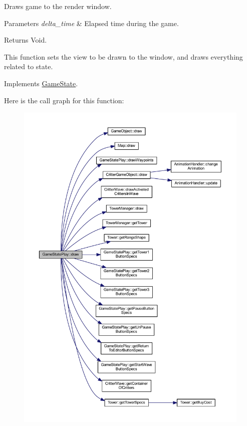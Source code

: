 Draws game to the render window. 


\begin{DoxyParams}{Parameters}
{\em delta\+\_\+time} & Elapsed time during the game. \\
\hline
\end{DoxyParams}
\begin{DoxyReturn}{Returns}
Void.
\end{DoxyReturn}
This function sets the view to be drawn to the window, and draws everything related to state. 

Implements \hyperlink{class_game_state_a55a6a68aabdf7054ea0e6ddbf24902df}{Game\+State}.



Here is the call graph for this function\+:
\nopagebreak
\begin{figure}[H]
\begin{center}
\leavevmode
\includegraphics[width=350pt]{class_game_state_play_a63a3ba0c891afd8ec126806bab4f315a_cgraph}
\end{center}
\end{figure}




